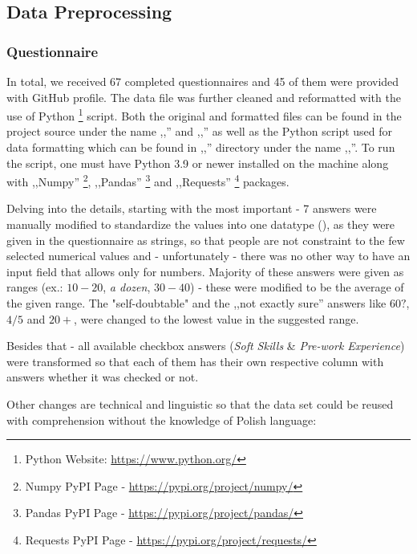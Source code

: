 \subsection{Data Preprocessing}
\label{sec:data-preprocessing}

\subsubsection{Questionnaire}
\label{sec:data-prep-questionnaire}

In total, we received 67 completed questionnaires and 45 of them were provided with GitHub profile. The data file was further cleaned and reformatted with the use of Python \footnote{Python Website: \url{https://www.python.org/}} script. Both the original and formatted  files can be found in the project source under the name ,,'' and ,,'' as well as the Python script used for data formatting which can be found in ,,'' directory under the name ,,''. To run the script, one must have Python 3.9 or newer installed on the machine along with ,,Numpy'' \footnote{Numpy PyPI Page - \url{https://pypi.org/project/numpy/}}, ,,Pandas'' \footnote{Pandas PyPI Page - \url{https://pypi.org/project/pandas/}} and ,,Requests'' \footnote{Requests PyPI Page - \url{https://pypi.org/project/requests/}} packages.

Delving into the details, starting with the most important - 7 answers were manually modified to standardize the values into one datatype (), as they were given in the questionnaire as strings, so that people are not constraint to the few selected numerical values and - unfortunately - there was no other way to have an input field that allows only for  numbers. Majority of these answers were given as ranges (ex.: $10 - 20$, \emph{a dozen}, $30-40$) - these were modified to be the average of the given range. The "self-doubtable" and the ,,not exactly sure'' answers like $60?$, $4/5$ and $20+$, were changed to the lowest value in the suggested range. 

Besides that - all available checkbox answers (\emph{Soft Skills} \& \emph{Pre-work Experience}) were transformed so that each of them has their own respective column with  answers whether it was checked or not.

Other changes are technical and linguistic so that the data set could be reused with comprehension without the knowledge of Polish language:


